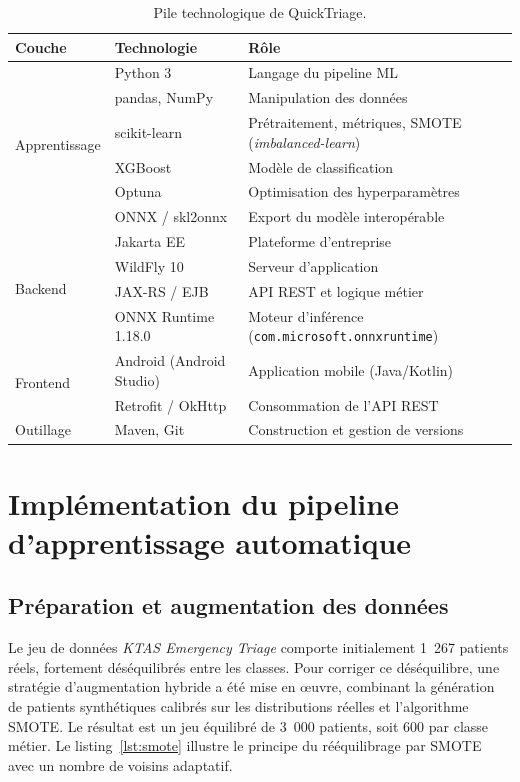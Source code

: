 \begin{table}[h]
\centering
\renewcommand{\arraystretch}{1.35}
\begin{tabular}{p{3cm} p{5cm} p{5.5cm}}
\toprule
\textbf{Couche} & \textbf{Technologie} & \textbf{Rôle} \\
\midrule
\multirow{6}{*}{Apprentissage}
 & Python 3 & Langage du pipeline ML \\
 & pandas, NumPy & Manipulation des données \\
 & scikit-learn & Prétraitement, métriques, SMOTE (\textit{imbalanced-learn}) \\
 & XGBoost & Modèle de classification \\
 & Optuna & Optimisation des hyperparamètres \\
 & ONNX / skl2onnx & Export du modèle interopérable \\
\midrule
\multirow{4}{*}{Backend}
 & Jakarta EE & Plateforme d'entreprise \\
 & WildFly 10 & Serveur d'application \\
 & JAX-RS / EJB & API REST et logique métier \\
 & ONNX Runtime 1.18.0 & Moteur d'inférence (\texttt{com.microsoft.onnxruntime}) \\
\midrule
\multirow{2}{*}{Frontend}
 & Android (Android Studio) & Application mobile (Java/Kotlin) \\
 & Retrofit / OkHttp & Consommation de l'API REST \\
\midrule
Outillage & Maven, Git & Construction et gestion de versions \\
\bottomrule
\end{tabular}
\caption{Pile technologique de QuickTriage.}
\label{tab:stack}
\end{table}

\section{Implémentation du pipeline d'apprentissage automatique}

\subsection{Préparation et augmentation des données}
Le jeu de données \textit{KTAS Emergency Triage} comporte initialement 1~267 patients réels,
fortement déséquilibrés entre les classes. Pour corriger ce déséquilibre, une stratégie
d'augmentation hybride a été mise en œuvre, combinant la génération de patients synthétiques
calibrés sur les distributions réelles et l'algorithme SMOTE. Le résultat est un jeu équilibré de
3~000 patients, soit 600 par classe métier. Le listing~\ref{lst:smote} illustre le principe du
rééquilibrage par SMOTE avec un nombre de voisins adaptatif.

